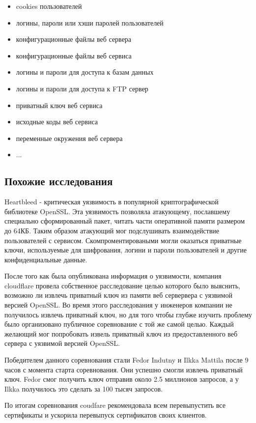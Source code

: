 \documentclass[20pt]{article}
\begin{document}
\begin{itemize}
  \item cookies пользователей
  \item логины, пароли или хэши паролей пользователей
  \item конфигурационные файлы веб сервера
  \item конфигурационные файлы веб сервиса
  \item логины и пароли для доступа к базам данных
  \item логины и пароли для доступа к FTP сервер
  \item приватный ключ веб сервиса
  \item исходные коды веб сервиса
  \item переменные окружения веб сервера
  \item ...
\end{itemize}

\subsection{Похожие исследования}
Heartbleed - критическая уязвимость в популярной криптографической библиотеке
OpenSSL. Эта уязвимость позволяла атакующему, пославшему специально сформированный
пакет, читать части оперативной памяти размером до 64КБ. Таким образом атакующий
мог подслушивать взаимодействие пользователей с сервисом. Скомпроментироваными
могли оказаться приватные ключи, используемые для шифрования, логини и пароли
пользователей и другие конфиденциальные данные.

После того как была опубликована информация о уязвимости, компания cloudflare
провела собственное расследование целью которого было выяснить, возможно ли извлечь
приватный ключ из памяти веб сервервера с уязвимой версией OpenSSL. Во время этого
расследования у инженеров компании не получилось извлечь приватный ключ, но для
того чтобы глубже изучить проблему было организовано публичное соревнование с той
же самой целью. Каждый желающий мог попробовать извель приватный ключ из
предоставленного веб сервера с уязвимой версией OpenSSL.

Победителем данного соревнования стали Fedor Indutny и Ilkka Mattila после 9 часов
с момента старта соревнования. Они успешно смогли извлечь приватный ключ. Fedor
смог получить ключ отправив около 2.5 миллионов запросов, а у Ilkka получилось
это сделать за 100 тысяч запросов.

По итогам соревнования coudfare рекомендовала всем перевыпустить все сертификаты
и ускорила перевыпуск сертификатов своих клиентов.
\end{document}
